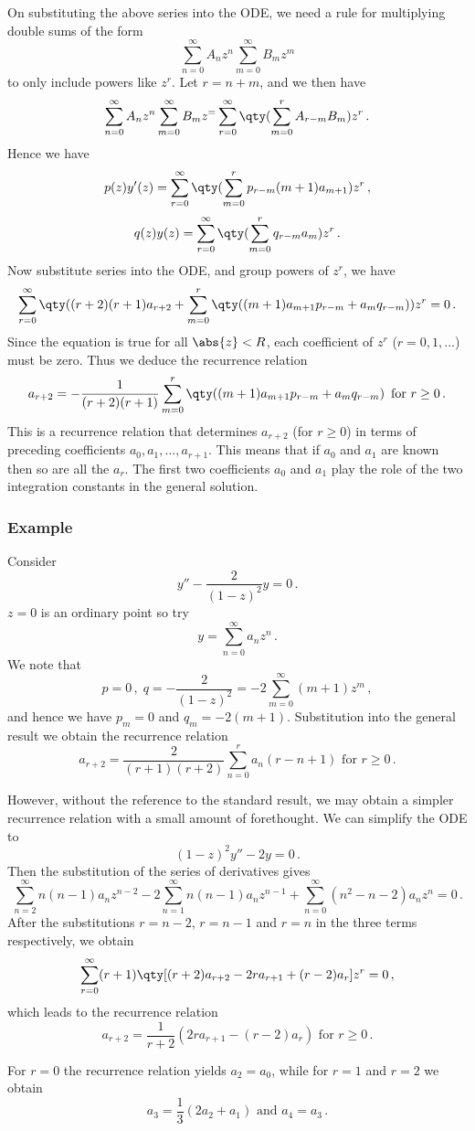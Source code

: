 \documentclass{article}
\theoremstyle{plain}\theoremheaderfont{\normalfont\itshape}\theorembodyfont{\rmfamily}\theoremseparator{.}\newtheorem*{rem}{Remark}\newtheorem*{ex}{Example}\newtheorem*{proof}{Proof}\newtheorem*{altp}{Alternative proof}
\theoremstyle{plain}\theoremheaderfont{\normalfont\bfseries}\theorembodyfont{\rmfamily}\theoremseparator{.}\newtheorem{thm}{Theorem}[section]\newtheorem{lem}[thm]{Lemma}\newtheorem{prop}[thm]{Proposition}\newtheorem*{cor}{Corollary}\newtheorem{defn}[thm]{Definition}\newtheorem{clm}[thm]{Claim}\newtheorem{clminproof}{Claim}
\theoremstyle{break}\theoremheaderfont{\normalfont\itshape}\theorembodyfont{\rmfamily}\theoremseparator{.\medskip}\newtheorem*{proofskip}{Proof}\newtheorem*{exs}{Examples}\newtheorem*{rems}{Remarks}
\theoremstyle{break}\theoremheaderfont{\normalfont\bfseries}\theorembodyfont{\rmfamily}\theoremseparator{.\medskip}\newtheorem{lemskip}[thm]{Lemma}\newtheorem{defnskip}[thm]{Definition}\newtheorem{propskip}[thm]{Proposition}\newtheorem{thmskip}[thm]{Theorem}
\numberwithin{equation}{section}
\begin{document}
	On substituting the above series into the ODE, we need a rule for multiplying double sums of the form
	\[\sum_{n=0}^{\infty}A_nz^n\sum_{m=0}^{\infty}B_m z^m\]
	to only include powers like \(z^r\). Let \(r=n+m\), and we then have
	\[\sum_{n=0}^{\infty}A_nz^n\sum_{m=0}^{\infty}B_m z^=\sum_{r=0}^{\infty}\qty(\sum_{m=0}^{r}A_{r-m}B_m)z^r\,.\]
	Hence we have
	\[p(z)y'(z)=\sum_{r=0}^{\infty}\qty(\sum_{m=0}^{r}p_{r-m}(m+1)a_{m+1})z^r\,,\]
	\[q(z)y(z)=\sum_{r=0}^{\infty}\qty(\sum_{m=0}^{r}q_{r-m}a_m)z^r\,.\]
	Now substitute series into the ODE, and group powers of \(z^r\), we have
	\[\sum_{r=0}^{\infty}\qty((r+2)(r+1)a_{r+2}+\sum_{m=0}^{r}\qty((m+1)a_{m+1}p_{r-m}+a_mq_{r-m}))z^r=0\,.\]
	Since the equation is true for all \(\abs{z}<R\), each coefficient of \(z^r\) (\(r=0,1,\dots\)) must be zero. Thus we deduce the recurrence relation
	\[a_{r+2}=-\frac{1}{(r+2)(r+1)}\sum_{m=0}^{r}\qty((m+1)a_{m+1}p_{r-m}+a_mq_{r-m})\,\text{ for }r\ge 0\,.\]
	This is a recurrence relation that determines \(a_{r+2}\) (for \(r\ge 0\)) in terms of preceding coefficients \(a_0,a_1,\dots,a_{r+1}\). This means that if \(a_0\) and \(a_1\) are known then so are all the \(a_r\). The first two coefficients \(a_0\) and \(a_1\) play the role of the two integration constants in the general solution.
	\subsubsection{Example}
	Consider
	\[y''-\frac{2}{(1-z)^2}y=0\,.\]
	\(z=0\) is an ordinary point so try
	\[y=\sum_{n=0}^{\infty}a_nz^n\,.\]
	We note that
	\[p=0\,,\;q=-\frac{2}{(1-z)^2}=-2\sum_{m=0}^{\infty}(m+1)z^m\,,\]
	and hence we have \(p_m=0\) and \(q_m=-2(m+1)\). Substitution into the general result we obtain the recurrence relation
	\[a_{r+2}=\frac{2}{(r+1)(r+2)}\sum_{n=0}^{r}a_n(r-n+1)\text{ for }r\ge 0\,.\]

	However, without the reference to the standard result, we may obtain a simpler recurrence relation with a small amount of forethought. We can simplify the ODE to
	\[(1-z)^2y''-2y=0\,.\]
	Then the substitution of the series of derivatives gives
	\[\sum_{n=2}^{\infty}n(n-1)a_nz^{n-2}-2\sum_{n=1}^{\infty}n(n-1)a_nz^{n-1}+\sum_{n=0}^{\infty}(n^2-n-2)a_nz^n=0\,.\]
	After the substitutions \(r=n-2\), \(r=n-1\) and \(r=n\) in the three terms respectively, we obtain
	\[\sum_{r=0}^{\infty}(r+1)\qty[(r+2)a_{r+2}-2ra_{r+1}+(r-2)a_r]z^r=0\,,\]
	which leads to the recurrence relation
	\[a_{r+2}=\frac{1}{r+2}(2ra_{r+1}-(r-2)a_r)\text{ for }r\ge0\,.\]
	
	For \(r=0\) the recurrence relation yields \(a_2=a_0\), while for \(r=1\) and \(r=2\) we obtain
	\[a_3=\frac{1}{3}(2a_2+a_1)\text{ and }a_4=a_3\,.\]
\end{document}
